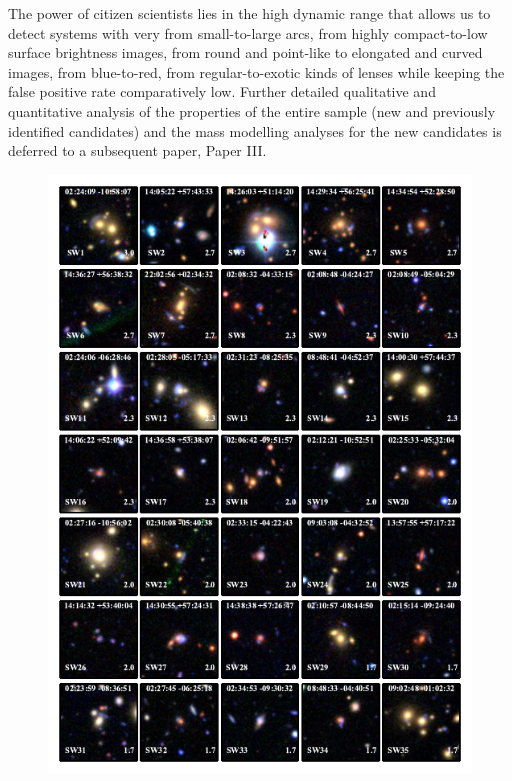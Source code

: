 \documentclass[useAMS,usenatbib,a4paper]{mn2e}
\begin{document}
The power of citizen scientists lies in the high dynamic range that
allows us to detect systems with very from small-to-large arcs, from
highly compact-to-low surface brightness images, from round and
point-like to elongated and curved images, from blue-to-red, from
regular-to-exotic kinds of lenses while keeping the false positive rate
comparatively low. Further detailed qualitative and quantitative
analysis of the properties of the entire \sw sample (new and previously
identified candidates) and the mass modelling analyses for the new
candidates is deferred to a subsequent \sw paper, Paper III.




\begin{figure}
\begin{center}
\includegraphics[scale=1.9]{sw-cfhtls-figs/lenscandfin.pdf}
\end{center}
\end{figure}
\end{document}
